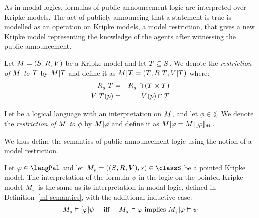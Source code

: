 As in modal logics, formulas of public announcement logic are interpreted over Kripke models.
The act of publicly announcing that a statement is true is modelled as an operation on Kripke models, a model restriction, that gives a new Kripke model representing the knowledge of the agents after witnessing the public announcement.

\begin{definition}
Let $\kModelAndTuple$ be a Kripke model and let $\kStatesT \subseteq \kStates$.
We denote the {\em restriction of $\kModel$ to $\kStatesT$} by $\restrict{\kModel}{\kStatesT}$ and
define it as $\restrict{\kModel}{\kStatesT} = (\kStatesT, \restrict{\kAccessibilityRel}{\kStatesT}, \restrict{\kValuation}{\kStatesT})$ where:
\begin{eqnarray*}
    \restrict{\kAccessibilityA}{\kStatesT} &=& \kAccessibilityA \cap (\kStatesT \times \kStatesT)\\
    \restrict{\kValuation}{\kStatesT}(\atomP) &=& \kValuation(\atomP) \cap \kStatesT
\end{eqnarray*}

Let \lang{} be a logical language with an interpretation on $\kModel$, and let $\phi \in \lang$.
We denote the {\em restriction of $\kModel$ to $\phi$} by $\restrict{\kModel}{\phi}$ and define it as $\restrict{\kModel}{\phi} = \restrict{\kModel}{\interpretation[\kModel]{\phi}}$.
\end{definition}


We thus define the semantics of public announcement logic using the notion of a model restriction.

\begin{definition}\label{pal-semantics}
Let $\phi \in \langPal$ and let $\kPModelAndTuple{\kStateS} \in \classS$ be a pointed Kripke model.
The interpretation of the formula $\phi$ in the logic \logicPalS{} on the pointed Kripke model $\kPModel{\kStateS}$ is the same as its interpretation in modal logic, defined in Definition~\ref{ml-semantics}, with the additional inductive case:
$$
\begin{array}{lcl}
\kPModel{\kStateS} \entails \announceA{\phi} \psi & \text{ iff } & \kPModel{\kStateS} \entails \phi \text{ implies } \restrict{\kPModel{\kStateS}}{\phi} \entails \psi
\end{array}
$$
\end{definition}

